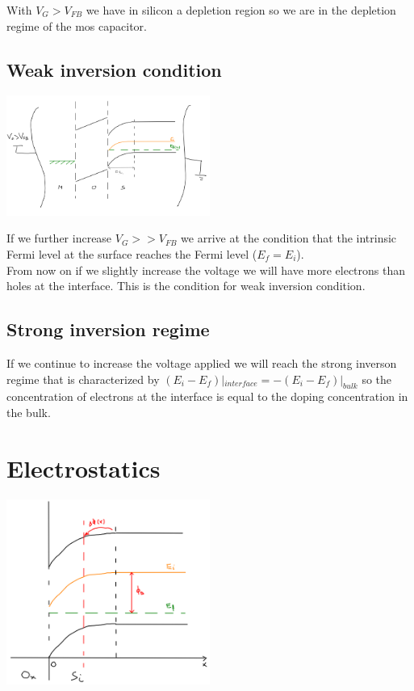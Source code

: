 With $V_G>V_{FB}$ we have in silicon a depletion region so we are in the depletion regime of the mos capacitor.
\subsection{Weak inversion condition}
\centering
\includegraphics[width=0.5\textwidth]{mos_weak.png}\\
\raggedright

If we further increase $V_G>>V_{FB}$ we arrive at the condition that the intrinsic Fermi level at the surface reaches the Fermi level ($E_f=E_i$).\\
From now on if we slightly increase the voltage we will have more electrons than holes at the interface. This is the condition for weak inversion condition.\\
\subsection{Strong inversion regime}
If we continue to increase the voltage applied we will reach the strong inverson regime that is characterized by $(E_i-E_f)|_{interface}=-(E_i-E_f)|_{bulk}$ so the concentration of electrons at the interface is equal to the doping concentration in the bulk.

\section{Electrostatics}
\centering
\includegraphics[width=0.5\textwidth]{mos_electrostatic.png}\\
\raggedright

